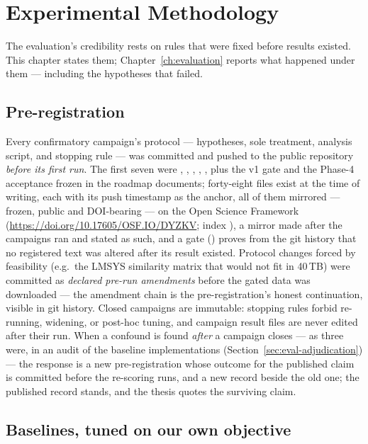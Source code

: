 \chapter{Experimental Methodology}
\label{ch:methodology}

The evaluation's credibility rests on rules that were fixed before results
existed. This chapter states them; Chapter~\ref{ch:evaluation} reports what
happened under them --- including the hypotheses that failed.

\section{Pre-registration}
\label{sec:method-prereg}

Every confirmatory campaign's protocol --- hypotheses, sole treatment,
analysis script, and stopping rule --- was committed and pushed to the
public repository \emph{before its first run}. The first seven were
, , ,
, , plus the v1 gate and
the Phase-4 acceptance frozen in the roadmap documents; forty-eight
 files exist at the time of writing, each with its
push timestamp as the anchor, all of them mirrored --- frozen, public and
DOI-bearing --- on the Open Science Framework
(\url{https://doi.org/10.17605/OSF.IO/DYZKV}; index ),
a mirror made after the campaigns ran and stated as such, and a gate
() proves from the git history that no
registered text was altered after its result existed. Protocol changes
forced by feasibility (e.g.\ the LMSYS similarity matrix that would not fit
in 40\,TB) were committed as \emph{declared pre-run amendments} before the
gated data was downloaded --- the amendment chain is the pre-registration's
honest continuation, visible in git history. Closed campaigns are
immutable: stopping rules forbid re-running, widening, or post-hoc tuning,
and campaign result files are never edited after their run. When a
confound is found \emph{after} a campaign closes --- as three were, in an
audit of the baseline implementations (Section~\ref{sec:eval-adjudication})
--- the response is a new pre-registration whose outcome for the published
claim is committed before the re-scoring runs, and a new record beside the
old one; the published record stands, and the thesis quotes the surviving
claim.

\section{Baselines, tuned on our own objective}
\label{sec:method-baselines}


